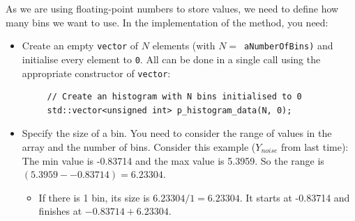 \documentclass[english,a4paper,12pt,oneside]{article}
\begin{document}
As we are using floating-point numbers to store values, we need to define how many bins we want to use. 
In the implementation of the method, you need:
\begin{itemize}
 \item Create an empty \verb+vector+ of $N$ elements (with $N=$~\verb+aNumberOfBins)+ and initialise every element to \verb+0+. All can be done in a single call using the appropriate constructor of \verb+vector+:
 
  \begin{lstlisting}
     // Create an histogram with N bins initialised to 0
     std::vector<unsigned int> p_histogram_data(N, 0);
  \end{lstlisting}

 
 \item Specify the size of a bin. You need to consider the range of values in the array and the number of bins. 
Consider this example ($Y_{noise}$ from last time): The min value is -0.83714 and the max value is 5.3959. So the range is $(5.3959 - -0.83714) = 6.23304$. 
\begin{itemize}
    \item If there is 1 bin, its size is $6.23304 / 1 = 6.23304$. It starts at -0.83714 and finishes at $-0.83714 + 6.23304$.


\end{itemize}
\end{itemize}
\end{document}
